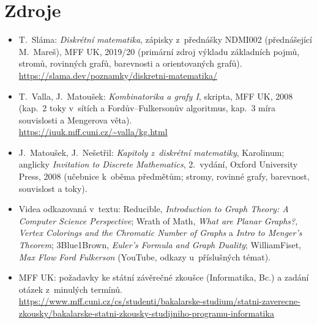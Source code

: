 \documentclass[11pt,a4paper]{article}
\begin{document}
\section*{Zdroje}

{\raggedright
\begin{itemize}
  \item T.~Sláma: \emph{Diskrétní matematika}, zápisky z~přednášky NDMI002 (přednášející M.~Mareš), MFF UK, 2019/20 (primární zdroj výkladu základních pojmů, stromů, rovinných grafů, barevnosti a orientovaných grafů).\\ \url{https://slama.dev/poznamky/diskretni-matematika/}
  \item T.~Valla, J.~Matoušek: \emph{Kombinatorika a grafy I}, skripta, MFF UK, 2008 (kap.~2 toky v~sítích a Fordův--Fulkersonův algoritmus, kap.~3 míra souvislosti a Mengerova věta).\\ \url{https://iuuk.mff.cuni.cz/~valla/kg.html}
  \item J.~Matoušek, J.~Nešetřil: \emph{Kapitoly z~diskrétní matematiky}, Karolinum; anglicky \emph{Invitation to Discrete Mathematics}, 2.~vydání, Oxford University Press, 2008 (učebnice k~oběma předmětům; stromy, rovinné grafy, barevnost, souvislost a toky).
  \item Videa odkazovaná v~textu: Reducible, \emph{Introduction to Graph Theory: A Computer Science Perspective}; Wrath of Math, \emph{What are Planar Graphs?}, \emph{Vertex Colorings and the Chromatic Number of Graphs} a \emph{Intro to Menger's Theorem}; 3Blue1Brown, \emph{Euler's Formula and Graph Duality}; WilliamFiset, \emph{Max Flow Ford Fulkerson} (YouTube, odkazy u~příslušných témat).
  \item MFF UK: požadavky ke státní závěrečné zkoušce (Informatika, Bc.) a zadání otázek z~minulých termínů.\\ \url{https://www.mff.cuni.cz/cs/studenti/bakalarske-studium/statni-zaverecne-zkousky/bakalarske-statni-zkousky-studijniho-programu-informatika}
\end{itemize}
\par}
\end{document}
